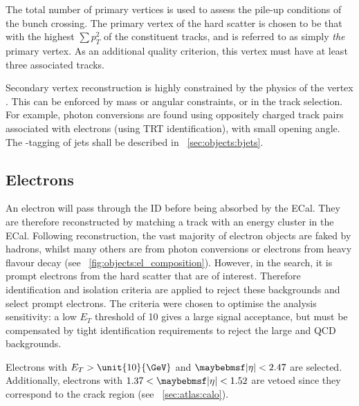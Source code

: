 The total number of primary vertices \npv is used to assess the pile-up conditions of 
the bunch crossing. The primary vertex of the hard scatter is chosen to be that with the 
highest $\sum p_T^2$ of the constituent tracks, and is referred to as simply \textit{the} 
primary vertex. As an additional quality criterion, this vertex must have at least three 
associated tracks.

Secondary vertex reconstruction is highly constrained by the physics of the vertex 
\cite{AllVertexFinding}. This can be enforced by mass or angular constraints, or in the 
track selection. For example, photon conversions are found using oppositely charged 
track pairs associated with electrons (using \acs{TRT} identification), with small 
opening angle. 
The \Pbottom-tagging of jets shall be described in \Section~\ref{sec:objects:bjets}.



\subsection{Electrons}
\label{sec:objects:electrons}

An electron will pass through the \ac{ID} before being absorbed by the \ac{ECal}. They 
are therefore reconstructed by matching a track with an energy cluster in the \ac{ECal}. 
Following reconstruction, the vast majority of electron objects are faked by hadrons, 
whilst many others are from photon conversions or electrons from heavy flavour decay (see 
\Figure~\ref{fig:objects:el_composition}). However, in the \HWWlvlv search, it is prompt 
electrons from the hard scatter that are of interest. Therefore identification and 
isolation criteria are applied to reject these backgrounds and select prompt electrons. 
The criteria were chosen to optimise the analysis sensitivity: \eg a low $E_T$ threshold 
of \unit{10}{\GeV} gives a large signal acceptance, but must be compensated by tight 
identification requirements to reject the large \Wjets and QCD backgrounds.

Electrons with $E_T > \unit{10}{\GeV}$ and $\mods{\eta} < 2.47$ are selected. Additionally, electrons with $1.37 < \mods{\eta} < 1.52$ are vetoed since they correspond
to the crack region (see \Section~\ref{sec:atlas:calo}).

